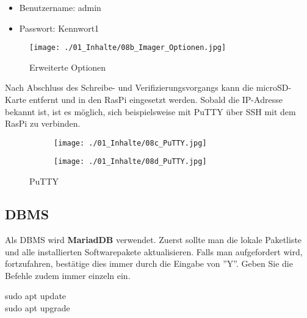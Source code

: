 \begin{minipage}{0.5\textwidth}
	\begin{itemize}
		\item Benutzername: admin
		\item Passwort: Kennwort1
	\end{itemize}
\end{minipage}%
\begin{minipage}{0.5\textwidth}		
	\begin{figure}[H]
		\centering
		\texttt{[image: ./01\_Inhalte/08b\_Imager\_Optionen.jpg]}
		\caption{Erweiterte Optionen}
		\label{fig:ImagerOptionen}
	\end{figure}
\end{minipage}	



Nach Abschluss des Schreibe- und Verifizierungsvorgangs kann die microSD-Karte entfernt und in den \ac{RasPi} eingesetzt werden. Sobald die IP-Adresse bekannt ist, ist es möglich, sich beispielsweise mit PuTTY über SSH mit dem \ac{RasPi} zu verbinden.

\begin{figure}[H]
	\centering
	\begin{subfigure}[t]{0.35\textwidth}
		\begin{adjustbox}{valign=c,center}
			\texttt{[image: ./01\_Inhalte/08c\_PuTTY.jpg]}
		\end{adjustbox}
	\end{subfigure}
	\hfill
	\begin{subfigure}[t]{0.62\textwidth}
		\begin{adjustbox}{valign=c,center}
			\texttt{[image: ./01\_Inhalte/08d\_PuTTY.jpg]}
		\end{adjustbox}
	\end{subfigure}
	\caption{PuTTY}
	\label{fig:PuTTY}
\end{figure}


\subsection{\ac{DBMS}}
Als \ac{DBMS} wird \textbf{MariadDB} verwendet. Zuerst sollte man die lokale Paketliste und alle installierten Softwarepakete aktualisieren. Falls man aufgefordert wird, fortzufahren, bestätige dies immer durch die Eingabe von ''Y''. Geben Sie die Befehle zudem immer einzeln ein.

\begin{Textfeld1}
	sudo apt update \\
	sudo apt upgrade
\end{Textfeld1}

